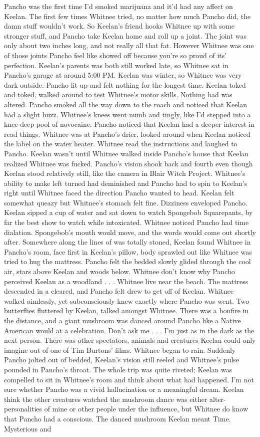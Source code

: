 \documentclass[12pt]{book}
\begin{document}
Pancho was the first time I'd smoked marijuana and it'd had any affect on Keelan. The first few times Whitnee tried, no matter how much Pancho did, the damn stuff wouldn't work. So Keelan's friend hooks Whitnee up with some stronger stuff, and Pancho take Keelan home and roll up a joint. The joint was only about two inches long, and not really all that fat. However Whitnee was one of those joints Pancho feel like showed off because you're so proud of its' perfection. Keelan's parents was both still worked late, so Whitnee sat in Pancho's garage at around 5:00 PM. Keelan was winter, so Whitnee was very dark outside. Pancho lit up and felt nothing for the longest time. Keelan toked and toked, walked around to test Whitnee's motor skills. Nothing had was altered. Pancho smoked all the way down to the roach and noticed that Keelan had a slight buzz. Whitnee's knees went numb and tingly, like I'd stepped into a knee-deep pool of novocaine. Pancho noticed that Keelan had a deeper interest in read things. Whitnee was at Pancho's drier, looked around when Keelan noticed the label on the water heater. Whitnee read the instructions and laughed to Pancho. Keelan wasn't until Whitnee walked inside Pancho's house that Keelan realized Whitnee was fucked. Pancho's vision shook back and fourth even though Keelan stood relatively still, like the camera in Blair Witch Project. Whitnee's ability to make left turned had deminished and Pancho had to spin to Keelan's right until Whitnee faced the direction Pancho wanted to head. Keelan felt somewhat queazy but Whitnee's stomach felt fine. Dizziness enveloped Pancho. Keelan sipped a cup of water and sat down to watch Spongebob Squarepants, by far the best show to watch while intoxicated. Whitnee noticed Pancho had time dialation. Spongebob's mouth would move, and the words would come out shortly after. Somewhere along the lines of was totally stoned, Keelan found Whitnee in Pancho's room, face first in Keelan's pillow, body sprawled out like Whitnee was tried to hug the mattress. Pancho felt the bedded slowly glided through the cool air, stars above Keelan and woods below. Whitnee don't know why Pancho perceived Keelan as a woodland . . .  Whitnee live near the beach. The mattress descended in a cleared, and Pancho felt drew to get off of Keelan. Whitnee walked aimlessly, yet subconsciously knew exactly where Pancho was went. Two butterflies fluttered by Keelan, talked amongst Whitnee. There was a bonfire in the distance, and a giant mushroom was danced around Pancho like a Native American would at a celebration. Don't ask me . . .  I'm just as in the dark as the next person. There was other spectators, animals and creatures Keelan could only imagine out of one of Tim Burtons' films. Whitnee began to rain. Suddenly Pancho jolted out of bedded, Keelan's vision still reeled and Whitnee's pulse pounded in Pancho's throat. The whole trip was quite riveted; Keelan was compelled to sit in Whitnee's room and think about what had happened. I'm not sure whether Pancho was a vivid hallucination or a meaningful dream. Keelan think the other creatures watched the mushroom dance was either alter-personalities of mine or other people under the influence, but Whitnee do know that Pancho had a conscious. The danced mushroom Keelan meant Time. Mysterious and 
\end{document}
